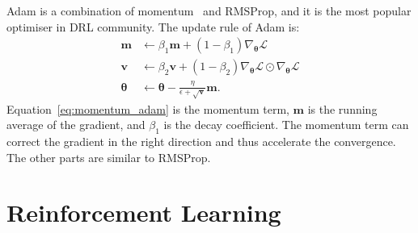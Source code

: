 Adam is a combination of momentum~\cite{qian1999momentum} and RMSProp, and it is the most popular optimiser in DRL community. The update rule of Adam is:
\begin{align}
    \mathbf{m} &\leftarrow \beta_{1} \mathbf{m} + (1 - \beta_{1})\nabla_{\bm{\theta}}\mathcal{L} \label{eq:momentum_adam}\\
    \mathbf{v} &\leftarrow \beta_{2} \mathbf{v} + (1 - \beta_{2})\nabla_{\bm{\theta}}\mathcal{L}\odot\nabla_{\bm{\theta}}\mathcal{L} \label{eq:squared_grad_adam}\\
     \bm{\theta} &\leftarrow \bm{\theta} - \frac{\eta}{\epsilon+\sqrt{\mathbf{v}}}\mathbf{m} \label{eq:adam_update}.
\end{align}
Equation~\eqref{eq:momentum_adam} is the momentum term, $\mathbf{m}$ is the running average of the gradient, and $\beta_{1}$ is the decay coefficient. The momentum term can correct the gradient in the right direction and thus accelerate the convergence. The other parts are similar to RMSProp.

\section{Reinforcement Learning}
\label{ch3:rl}
